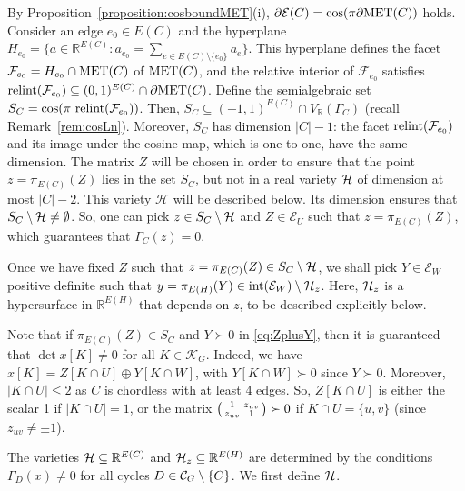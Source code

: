 \documentclass[a4paper, 11pt, twoside]{article}
\newcommand{\R}{\mathbb{R}}
\newcommand{\ME}{{\mathcal E}}
\newcommand{\MF}{{\mathcal F}}
\newcommand{\MET}{\text{\rm MET}}
\newcommand{\MK}{{\mathcal K}}
\newcommand{\MH}{{\mathcal H}}
\theoremstyle{plain}
\begin{document}
 By Proposition~\ref{proposition:cosboundMET}(i), 
$\partial \ME(C)=\cos(\pi \partial \MET(C))$ holds. 
Consider an edge $e_0\in E(C)$ and the 
 hyperplane $H_{e_0}=\{a\in\R^{E(C)}: a_{e_0}=\sum_{e\in E(C)\setminus \{e_0\}} a_e\}$. This hyperplane  defines the
 facet $\MF_{e_0}=H_{e_0}\cap \MET(C)$ of $\MET(C)$,
and the relative interior of $\MF_{e_0}$ satisfies 
$\text{\rm relint}(\MF_{e_0})\subseteq (0,1)^{E(C)}\cap \partial \MET(C)$. Define the semialgebraic set
$S_C=\cos( \pi \ \text{\rm relint}(\MF_{e_0}))$. Then, $S_C\subseteq (-1,1)^{E(C)}\cap V_\R(\Gamma_C)$ (recall Remark~\ref{rem:cosLn}).
Moreover, $S_C$ has dimension $|C|-1$: the facet $\text{\rm relint}(\MF_{e_0})$ and its image under the cosine map, which is one-to-one, have the same dimension.
The matrix $Z$   will be chosen in order to ensure that the point $z = \pi_{E(C)}(Z)$ lies in the set $ S_C$, but not  in a real variety ${\cal H}$ of dimension at most $|C|-2$. This variety $\MH$ will be described below.  Its dimension ensures that $S_C \setminus {\cal H} \neq \emptyset$. So, one can pick $z\in S_C \setminus {\cal H}$ and $Z\in \ME_U$ such that $z=\pi_{E(C)}(Z)$, which  guarantees that $\Gamma_C(z)=0$. 
 
Once we have fixed $Z$ such that $z=\pi_{E(C)}(Z) \in S_C \setminus {\cal H}$, we shall pick $Y \in\ME_W$ positive definite such that $y = \pi_{E(H)}(Y) \in {\rm int}(\ME_W) \setminus {\cal H}_z$. Here, ${\cal H}_z$ is a hypersurface in $\mathbb{R}^{E(H)}$ that depends on $z$, to be described explicitly below. 

Note that if $\pi_{E(C)}(Z) \in S_C$ and $Y\succ 0$ in \eqref{eq:ZplusY}, then it is guaranteed that $\det x[K] \neq 0$ for all $K \in \MK_G$. Indeed, we have
$x[K]=Z[K\cap U]\oplus Y[K\cap W]$, with $Y[K\cap W]\succ 0$ since $Y\succ 0$. Moreover, $|K\cap U|\le 2$ as $C$ is chordless with  at least 4 edges. 
So, $Z[K\cap U]$ is either the scalar 1 if $|K\cap U|=1$, or the matrix 
$\left(\begin{smallmatrix} 1& z_{uv}\cr z_{uv}& 1\end{smallmatrix}\right)\succ 0$ if $K\cap U=\{u,v\}$ (since $z_{uv}\ne \pm 1$).

The varieties ${\cal H} \subseteq \mathbb{R}^{E(C)}$   and ${\cal H}_z \subseteq\mathbb{R}^{E(H)}$     are determined by the conditions $\Gamma_D(x) \neq 0$ for all cycles $D \in {\cal C}_G \setminus \{C\}$. We first define ${\cal H}$.
\end{document}

